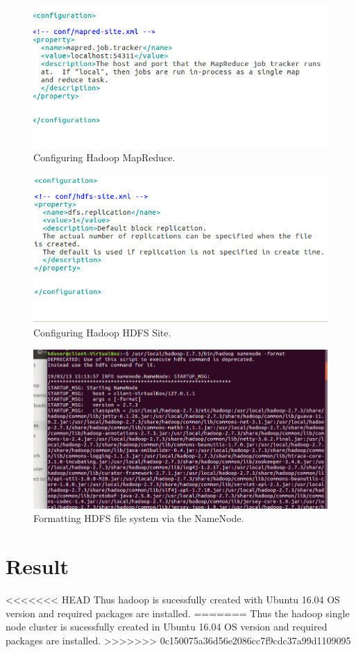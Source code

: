 \documentclass[a4paper,10pt]{article}
\begin{document}
	\begin{figure}[h]
		\includegraphics[scale=0.30,center]{exptTwoScreenShot/fig8.png}
		\caption{Configuring Hadoop MapReduce.}
		\label{fig:8}
	\end{figure}
	
	\begin{figure}[h]
		\includegraphics[scale=0.30,center]{exptTwoScreenShot/fig9.png}
		\caption{Configuring Hadoop HDFS Site.}
		\label{fig:9}
	\end{figure}

\pagebreak

	\begin{figure}[h]
		\includegraphics[scale=0.30,center]{exptTwoScreenShot/fig10.png}
		\caption{Formatting HDFS file system via the NameNode.}
		\label{fig:8}
	\end{figure}


\section{Result}
<<<<<<< HEAD
Thus hadoop is sucessfully created with Ubuntu 16.04 OS version and required packages are installed.
=======
Thus the hadoop single node cluster is sucessfully created in Ubuntu 16.04 OS version and required packages are installed.
>>>>>>> 0c150075a36d56e2086cc7f9cdc37a99d1109095
\end{document}

